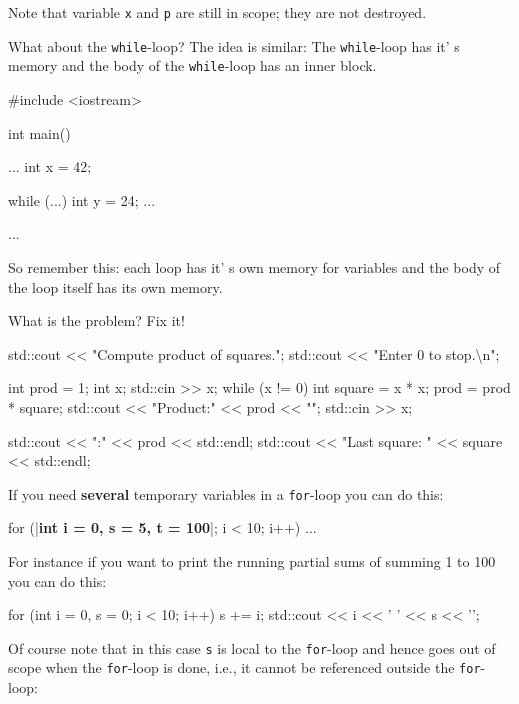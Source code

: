 Note that variable \texttt{x} and \texttt{p} are still in scope; they are not destroyed.

What about the \texttt{while}-loop? The idea is similar: The \texttt{while}-loop has it' s memory and the body of the \texttt{while}-loop has an inner block.

\begin{console}
#include <iostream>

int main()
{    
     ...
     int x = 42;

     while (...)
     {     
           int y = 24;
           ...
     }

     ...
}
\end{console}

So remember this: each loop has it' s own memory for
variables and the body of the loop itself has its own memory.

\begin{ex} What is the problem? Fix it!

\begin{console}
std::cout << "Compute product of squares.";
std::cout << "Enter 0 to stop.\textbackslash n";

int prod = 1;
int x;
std::cin >> x;
while (x != 0)
{     
     int square = x * x;
     prod = prod * square;
     std::cout << "Product:" << prod << "\n";
     std::cin >> x;
}

std::cout << "\nProduct:" << prod << std::endl;
std::cout << "Last square: " << square
          << std::endl;
\end{console}
\end{ex}
If you need \textbf{several} temporary variables in a \texttt{for}-loop
you can do this:

\begin{consolethree}[escapeinside=||]
for (|\textbf{int i = 0, s = 5, t = 100}|; i < 10; i++)
{
    ...
}
\end{consolethree}

For instance if you want to print the running partial sums of summing 1
to 100 you can do this:

\begin{console}
for (int i = 0, s = 0; i < 10; i++)
{   
    s += i;
    std::cout << i << ' ' << s << '\n';
}
\end{console}

Of course note that in this case \texttt{s} is local to the \texttt{for}-loop and hence goes out of scope when the \texttt{for}-loop is done, i.e., it cannot be referenced outside the \texttt{for}-loop:

